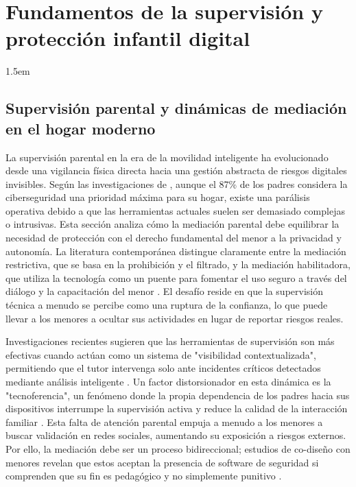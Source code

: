\chapter{Fundamentos de la supervisión y protección infantil digital}
\label{chap:fundamentos-supervision}

\insertminitoc
\parindent1.5em

\section{Supervisión parental y dinámicas de mediación en el hogar moderno}

La supervisión parental en la era de la movilidad inteligente ha evolucionado desde una vigilancia física directa hacia una gestión abstracta de riesgos digitales invisibles. Según las investigaciones de \cite{ayyash_cybersecurity_2024}, aunque el 87\% de los padres considera la ciberseguridad una prioridad máxima para su hogar, existe una parálisis operativa debido a que las herramientas actuales suelen ser demasiado complejas o intrusivas. Esta sección analiza cómo la mediación parental debe equilibrar la necesidad de protección con el derecho fundamental del menor a la privacidad y autonomía. La literatura contemporánea distingue claramente entre la mediación restrictiva, que se basa en la prohibición y el filtrado, y la mediación habilitadora, que utiliza la tecnología como un puente para fomentar el uso seguro a través del diálogo y la capacitación del menor \cite{livingstone_maximizing_2017}. El desafío reside en que la supervisión técnica a menudo se percibe como una ruptura de la confianza, lo que puede llevar a los menores a ocultar sus actividades en lugar de reportar riesgos reales.

Investigaciones recientes sugieren que las herramientas de supervisión son más efectivas cuando actúan como un sistema de "visibilidad contextualizada", permitiendo que el tutor intervenga solo ante incidentes críticos detectados mediante análisis inteligente \cite{stoilova_parental_2024}. Un factor distorsionador en esta dinámica es la "tecnoferencia", un fenómeno donde la propia dependencia de los padres hacia sus dispositivos interrumpe la supervisión activa y reduce la calidad de la interacción familiar \cite{selak_problematic_2025}. Esta falta de atención parental empuja a menudo a los menores a buscar validación en redes sociales, aumentando su exposición a riesgos externos. Por ello, la mediación debe ser un proceso bidireccional; estudios de co-diseño con menores revelan que estos aceptan la presencia de software de seguridad si comprenden que su fin es pedagógico y no simplemente punitivo \cite{mcnally_co-designing_2018}.

